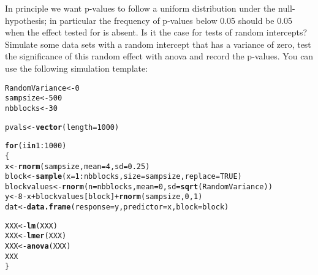 \documentclass[12pt,a4paper]{scrartcl}\usepackage[]{graphicx}\usepackage[]{color}
\makeatletter
\newcommand{\hlnum}[1]{\textcolor[rgb]{0.686,0.059,0.569}{#1}}%
\newcommand{\hlopt}[1]{\textcolor[rgb]{0,0,0}{#1}}%
\newcommand{\hlstd}[1]{\textcolor[rgb]{0.345,0.345,0.345}{#1}}%
\newcommand{\hlkwa}[1]{\textcolor[rgb]{0.161,0.373,0.58}{\textbf{#1}}}%
\newcommand{\hlkwb}[1]{\textcolor[rgb]{0.69,0.353,0.396}{#1}}%
\newcommand{\hlkwc}[1]{\textcolor[rgb]{0.333,0.667,0.333}{#1}}%
\newcommand{\hlkwd}[1]{\textcolor[rgb]{0.737,0.353,0.396}{\textbf{#1}}}%
\newenvironment{kframe}{%
 \def\at@end@of@kframe{}%
 \ifinner\ifhmode%
  \def\at@end@of@kframe{\end{minipage}}%
  \begin{minipage}{\columnwidth}%
 \fi\fi%
 \def\FrameCommand##1{\hskip\@totalleftmargin \hskip-\fboxsep
 \colorbox{shadecolor}{##1}\hskip-\fboxsep
     \hskip-\linewidth \hskip-\@totalleftmargin \hskip\columnwidth}%
 \MakeFramed {\advance\hsize-\width
   \@totalleftmargin\z@ \linewidth\hsize
   \@setminipage}}%
 {\par\unskip\endMakeFramed%
 \at@end@of@kframe}
\newenvironment{knitrout}{}{} %
\makeatother
\begin{document}
\begin{Exercise}[difficulty=3, title={Does null-hypothesis testing work for random effect?}]
In principle we want p-values to follow a uniform distribution under the null-hypothesis; in particular the frequency of p-values below 0.05 should be 0.05 when the effect tested for is absent. Is it the case for tests of random intercepts?
Simulate some data sets with a random intercept that has a variance of zero,  test the significance of this random effect with anova and record the p-values.
You can use the following simulation template:

\begin{knitrout}
\color{fgcolor}\begin{kframe}
\begin{alltt}
\hlstd{RandomVariance} \hlkwb{<-} \hlnum{0}
\hlstd{sampsize} \hlkwb{<-} \hlnum{500}
\hlstd{nbblocks} \hlkwb{<-} \hlnum{30}

\hlstd{pvals} \hlkwb{<-} \hlkwd{vector}\hlstd{(}\hlkwc{length} \hlstd{=} \hlnum{1000}\hlstd{)}

\hlkwa{for} \hlstd{(i} \hlkwa{in} \hlnum{1}\hlopt{:}\hlnum{1000}\hlstd{)}
\hlstd{\{}
  \hlstd{x} \hlkwb{<-} \hlkwd{rnorm}\hlstd{(sampsize,}\hlkwc{mean} \hlstd{=} \hlnum{4}\hlstd{,} \hlkwc{sd}\hlstd{=}\hlnum{0.25}\hlstd{)}
  \hlstd{block} \hlkwb{<-} \hlkwd{sample}\hlstd{(}\hlkwc{x} \hlstd{=} \hlnum{1}\hlopt{:}\hlstd{nbblocks,} \hlkwc{size} \hlstd{= sampsize,} \hlkwc{replace} \hlstd{=} \hlnum{TRUE}\hlstd{)}
  \hlstd{blockvalues} \hlkwb{<-} \hlkwd{rnorm}\hlstd{(}\hlkwc{n} \hlstd{= nbblocks,} \hlkwc{mean} \hlstd{=} \hlnum{0}\hlstd{,} \hlkwc{sd} \hlstd{=} \hlkwd{sqrt}\hlstd{(RandomVariance))}
  \hlstd{y} \hlkwb{<-} \hlnum{8} \hlopt{-} \hlstd{x} \hlopt{+} \hlstd{blockvalues[block]} \hlopt{+} \hlkwd{rnorm}\hlstd{(sampsize,}\hlnum{0}\hlstd{,}\hlnum{1}\hlstd{)}
  \hlstd{dat} \hlkwb{<-} \hlkwd{data.frame}\hlstd{(}\hlkwc{response} \hlstd{= y,} \hlkwc{predictor} \hlstd{= x,} \hlkwc{block}\hlstd{=block)}

  \hlstd{XXX} \hlkwb{<-} \hlkwd{lm}\hlstd{(XXX)}
  \hlstd{XXX} \hlkwb{<-} \hlkwd{lmer}\hlstd{(XXX)}
  \hlstd{XXX} \hlkwb{<-} \hlkwd{anova}\hlstd{(XXX)}
  \hlstd{XXX}
\hlstd{\}}
\end{alltt}
\end{kframe}
\end{knitrout}


\end{Exercise}
\end{document}
